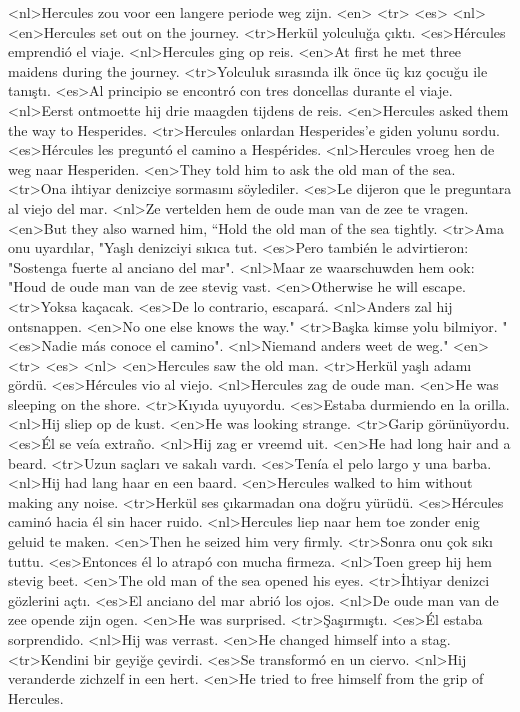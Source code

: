 <nl>Hercules zou voor een langere periode weg zijn.
<en>
<tr>
<es>
<nl>
<en>Hercules set out on the journey.
<tr>Herkül yolculuğa çıktı.
<es>Hércules emprendió el viaje.
<nl>Hercules ging op reis.
<en>At first he met three maidens during the journey.
<tr>Yolculuk sırasında ilk önce üç kız çocuğu ile tanıştı.
<es>Al principio se encontró con tres doncellas durante el viaje.
<nl>Eerst ontmoette hij drie maagden tijdens de reis.
<en>Hercules asked them the way to Hesperides.
<tr>Hercules onlardan Hesperides'e giden yolunu sordu.
<es>Hércules les preguntó el camino a Hespérides.
<nl>Hercules vroeg hen de weg naar Hesperiden.
<en>They told him to ask the old man of the sea.
<tr>Ona ihtiyar denizciye sormasını söylediler.
<es>Le dijeron que le preguntara al viejo del mar.
<nl>Ze vertelden hem de oude man van de zee te vragen.
<en>But they also warned him, “Hold the old man of the sea tightly.
<tr>Ama onu uyardılar, "Yaşlı denizciyi sıkıca tut.
<es>Pero también le advirtieron: "Sostenga fuerte al anciano del mar".
<nl>Maar ze waarschuwden hem ook: "Houd de oude man van de zee stevig vast.
<en>Otherwise he will escape.
<tr>Yoksa kaçacak.
<es>De lo contrario, escapará.
<nl>Anders zal hij ontsnappen.
<en>No one else knows the way."
<tr>Başka kimse yolu bilmiyor. "
<es>Nadie más conoce el camino".
<nl>Niemand anders weet de weg."
<en>
<tr>
<es>
<nl>
<en>Hercules saw the old man.
<tr>Herkül yaşlı adamı gördü.
<es>Hércules vio al viejo.
<nl>Hercules zag de oude man.
<en>He was sleeping on the shore.
<tr>Kıyıda uyuyordu.
<es>Estaba durmiendo en la orilla.
<nl>Hij sliep op de kust.
<en>He was looking strange.
<tr>Garip görünüyordu.
<es>Él se veía extraño.
<nl>Hij zag er vreemd uit.
<en>He had long hair and a beard.
<tr>Uzun saçları ve sakalı vardı.
<es>Tenía el pelo largo y una barba.
<nl>Hij had lang haar en een baard.
<en>Hercules walked to him without making any noise.
<tr>Herkül ses çıkarmadan ona doğru yürüdü.
<es>Hércules caminó hacia él sin hacer ruido.
<nl>Hercules liep naar hem toe zonder enig geluid te maken.
<en>Then he seized him very firmly.
<tr>Sonra onu çok sıkı tuttu.
<es>Entonces él lo atrapó con mucha firmeza.
<nl>Toen greep hij hem stevig beet.
<en>The old man of the sea opened his eyes.
<tr>İhtiyar denizci gözlerini açtı.
<es>El anciano del mar abrió los ojos.
<nl>De oude man van de zee opende zijn ogen.
<en>He was surprised.
<tr>Şaşırmıştı.
<es>Él estaba sorprendido.
<nl>Hij was verrast.
<en>He changed himself into a stag.
<tr>Kendini bir geyiğe çevirdi.
<es>Se transformó en un ciervo.
<nl>Hij veranderde zichzelf in een hert.
<en>He tried to free himself from the grip of Hercules.
